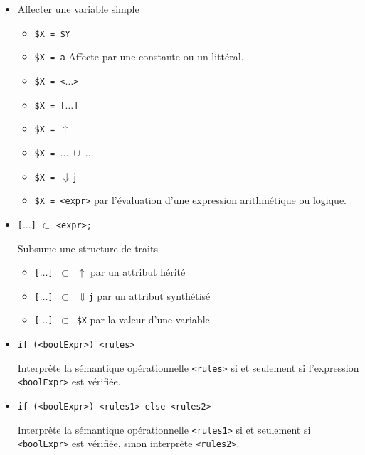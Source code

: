 \documentclass[11pt]{article}
\begin{document}
\begin{itemize}
\begin{itemize}
  \item  Affecter une variable simple
    \begin{itemize}
    \item \verb#$X = $Y#
    \item \verb#$X = a# Affecte par une constante ou un littéral.
    \item \verb#$X = <#$\dots$\verb#>#
    \item \verb#$X = [#$\dots$\verb#]#
    \item \verb#$X = #$\uparrow$
    \item \verb#$X = #$\dots$\verb# #$\cup$\verb# #$\dots$
    \item \verb#$X = #$\Downarrow$\verb#j#
    \item \verb#$X = <expr>#  par l'évaluation d'une expression
      arithmétique ou logique.
    \end{itemize}
    
  \item  \verb#[#$\dots$\verb#]# $\subset$ \verb#<expr>;#

    Subsume une structure de traits

     \begin{itemize}
    \item \verb#[#$\dots$\verb#] #$\subset$\verb# #$\uparrow$ par un
      attribut hérité
    \item \verb#[#$\dots$\verb#] #$\subset$\verb# #$\Downarrow$\verb#j# par un attribut synthétisé
    \item \verb#[#$\dots$\verb#] #$\subset$\verb# $X# par la valeur
      d'une variable 
    \end{itemize}
    
  \item \verb#if (<boolExpr>) <rules>#
    
Interprète la sémantique opérationnelle \verb#<rules># si et seulement
si l'expression \verb#<boolExpr># est vérifiée.



\item \verb#if (<boolExpr>) <rules1> else <rules2>#

Interprète la sémantique opérationnelle \verb#<rules1># si et
seulement si \verb#<boolExpr># est vérifiée, sinon interprète \verb#<rules2>#.

\end{itemize}


\end{itemize}
\end{document}
